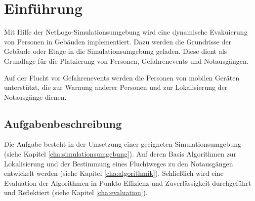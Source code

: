 \chapter{Einf\"uhrung}
\setcounter{page}{1}

Mit Hilfe der NetLogo-Simulationsumgebung \cite{Netlogo.1999} wird eine dynamische Evakuierung von Personen in Gebäuden implementiert. Dazu werden die Grundrisse der Gebäude oder Etage in die Simulationsumgebung geladen. Diese dient als Grundlage für die Platzierung von Personen, Gefahrenevents und Notausgängen. 

Auf der Flucht vor Gefahrenevents werden die Personen von mobilen Geräten unterstützt, die zur Warnung anderer Personen und zur Lokalisierung der Notausgänge dienen.


%



\section{Aufgabenbeschreibung}

Die Aufgabe besteht in der Umsetzung einer geeigneten Simulationsumgebung (siehe Kapitel \ref{cha:simulationsumgebung}). Auf deren Basis Algorithmen zur Lokalisierung und der Bestimmung eines Fluchtweges zu den Notausgängen entwickelt werden (siehe Kapitel \ref{cha:algorithmik}). Schließlich wird eine Evaluation der Algorithmen in Punkto Effizienz und Zuverlässigkeit durchgeführt und Reflektiert (siehe Kapitel \ref{cha:evaluation}).

